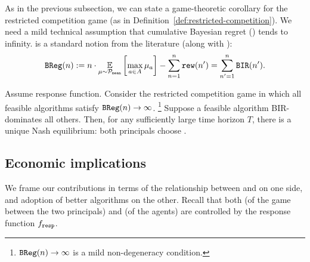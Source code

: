 As in the previous subsection, we can state a game-theoretic corollary for the restricted competition game (as in Definition~\ref{def:restricted-competition}). We need a mild technical assumption that cumulative Bayesian regret (\BReg) tends to infinity. \BReg is a standard notion from the literature (along with \BIR):
\begin{align}\label{eq:SoftMax-BReg}
\BReg(n) := n\cdot \E_{\mu\sim\priorMu}
    \left[ \max_{a\in A} \mu_a\right] - \sum_{n=1}^n \rew(n')
    = \sum_{n'=1}^n \BIR(n').
\end{align}


\begin{corollary}\label{cor:SoftMax-strong}
Assume \SoftMaxRandom response function. Consider the restricted competition game in which all feasible algorithms satisfy $\mathtt{BReg}(n)\to \infty$.%
\footnote{$\mathtt{BReg}(n)\to \infty$ is a mild non-degeneracy condition.
}
Suppose a feasible algorithm \alg BIR-dominates all others. Then, for any sufficiently large time horizon $T$, there is a unique Nash equilibrium: both principals choose \alg.
\end{corollary}





\subsection{Economic implications}
\label{sec:theory-welfare}

{We frame our contributions in terms of the relationship between \competitiveness and \rationality on one side, and adoption of better algorithms on the other. Recall that both \competitiveness (of the game between the two principals) and \rationality (of the agents) are controlled by the response function $f_{\mathtt{resp}}$.}


